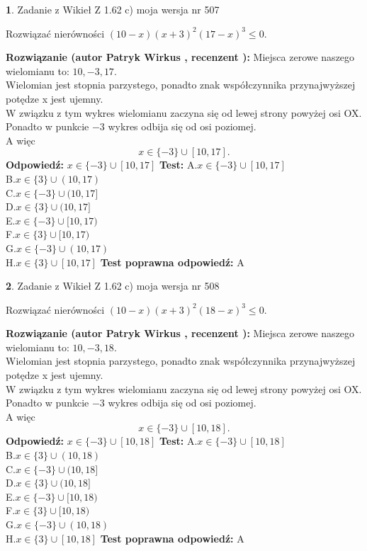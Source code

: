 \documentclass[12pt, a4paper]{article}
\theoremstyle{definition} %
\newtheorem{zad}{}
\newcommand{\zadStart}[1]{\begin{zad}#1\newline}
\newcommand{\zadStop}{\end{zad}}
\newcommand{\rozwStart}[2]{\noindent \textbf{Rozwiązanie (autor #1 , recenzent #2): }\newline}
\newcommand{\rozwStop}{\newline}
\newcommand{\odpStart}{\noindent \textbf{Odpowiedź:}\newline}
\newcommand{\odpStop}{\newline}
\newcommand{\testStart}{\noindent \textbf{Test:}\newline}
\newcommand{\testStop}{\newline}
\newcommand{\kluczStart}{\noindent \textbf{Test poprawna odpowiedź:}\newline}
\newcommand{\kluczStop}{\newline}
\begin{document}
\zadStart{Zadanie z Wikieł Z 1.62 c) moja wersja nr 507}

Rozwiązać nierówności $(10-x)(x+3)^{2}(17-x)^{3}\le0$.
\zadStop
\rozwStart{Patryk Wirkus}{}
Miejsca zerowe naszego wielomianu to: $10, -3, 17$.\\
Wielomian jest stopnia parzystego, ponadto znak współczynnika przy\linebreak najwyższej potędze x jest ujemny.\\ W związku z tym wykres wielomianu zaczyna się od lewej strony powyżej osi OX.\\
Ponadto w punkcie $-3$ wykres odbija się od osi poziomej.\\
A więc $$x \in \{-3\} \cup [10,17].$$
\rozwStop
\odpStart
$x \in \{-3\} \cup [10,17]$
\odpStop
\testStart
A.$x \in \{-3\} \cup [10,17]$\\
B.$x \in \{3\} \cup (10,17)$\\
C.$x \in \{-3\} \cup (10,17]$\\
D.$x \in \{3\} \cup (10,17]$\\
E.$x \in \{-3\} \cup [10,17)$\\
F.$x \in \{3\} \cup [10,17)$\\
G.$x \in \{-3\} \cup (10,17)$\\
H.$x \in \{3\} \cup [10,17]$
\testStop
\kluczStart
A
\kluczStop



\zadStart{Zadanie z Wikieł Z 1.62 c) moja wersja nr 508}

Rozwiązać nierówności $(10-x)(x+3)^{2}(18-x)^{3}\le0$.
\zadStop
\rozwStart{Patryk Wirkus}{}
Miejsca zerowe naszego wielomianu to: $10, -3, 18$.\\
Wielomian jest stopnia parzystego, ponadto znak współczynnika przy\linebreak najwyższej potędze x jest ujemny.\\ W związku z tym wykres wielomianu zaczyna się od lewej strony powyżej osi OX.\\
Ponadto w punkcie $-3$ wykres odbija się od osi poziomej.\\
A więc $$x \in \{-3\} \cup [10,18].$$
\rozwStop
\odpStart
$x \in \{-3\} \cup [10,18]$
\odpStop
\testStart
A.$x \in \{-3\} \cup [10,18]$\\
B.$x \in \{3\} \cup (10,18)$\\
C.$x \in \{-3\} \cup (10,18]$\\
D.$x \in \{3\} \cup (10,18]$\\
E.$x \in \{-3\} \cup [10,18)$\\
F.$x \in \{3\} \cup [10,18)$\\
G.$x \in \{-3\} \cup (10,18)$\\
H.$x \in \{3\} \cup [10,18]$
\testStop
\kluczStart
A
\kluczStop
\end{document}
